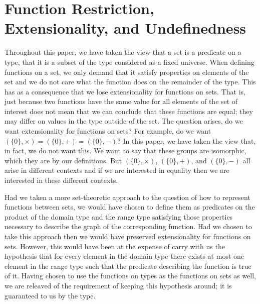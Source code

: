 \section{Function Restriction, Extensionality, and Undefinedness}

Throughout this paper, we have taken the view that a set is a
predicate on a type, that it is a subset of the type considered as a
fixed universe.  When defining functions on a set, we only demand that
it satisfy properties on elements of the set and we do not care what
the function does on the remainder of the type.  This has as a
consequence that we lose extensionality for functions on sets.  That
is, just because two functions have the same value for all elements of
the set of interest does not mean that we can conclude that these
functions are equal; they may differ on values in the type outside of
the set.  The question arises, do we want extensionality for functions
on sets?  For example, do we want $(\{0\},\times) = (\{0\},+) = (\{0\},-)$?
In this paper, we have taken the view that, in fact, we
do not want this.  We want to say that these groups are isomorphic,
which they are by our definitions.  But $(\{0\},\times)$, $(\{0\},+)$,
and $(\{0\},-)$ all arise in different contexts and if we are
interested in equality then we are interested in these different
contexts.

Had we taken a more set-theoretic approach to the question of how to
represent functions between sets, we would have chosen to define them
as predicates on the product of the domain type and the range type
satisfying those properties necessary to describe the graph of the
corresponding function.  Had we chosen to take this approach then we
would have preserved extensionality for functions on sets.  However,
this would have been at the expense of carry with us the hypothesis
that for every element in the domain type there exists at most one
element in the range type such that the predicate describing the
function is true of it.  Having chosen to use the functions on types
as the functions on sets as well, we are releaved of the requirement
of keeping this hypothesis around; it is guaranteed to us by the type.
